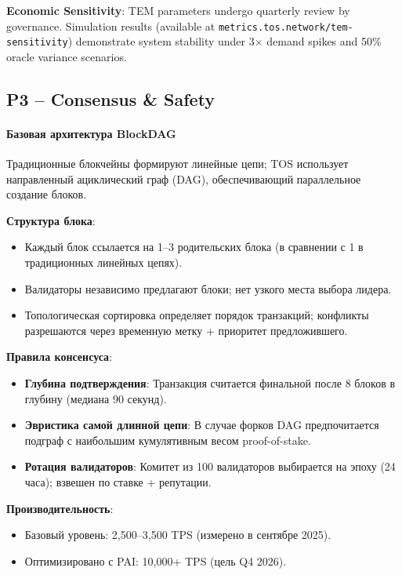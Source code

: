 \documentclass[11pt]{article}
\begin{document}
\textbf{Economic Sensitivity}: TEM parameters undergo quarterly review by governance. Simulation results (available at \texttt{metrics.tos.network/tem-sensitivity}) demonstrate system stability under 3$\times$ demand spikes and 50\% oracle variance scenarios.

\subsection{P3 -- Consensus \& Safety}
\label{sec:pillar-consensus}

\paragraph{Базовая архитектура BlockDAG}
Традиционные блокчейны формируют линейные цепи; TOS использует направленный ациклический граф (DAG), обеспечивающий параллельное создание блоков.

\textbf{Структура блока}:
\begin{itemize}[noitemsep]
  \item Каждый блок ссылается на 1--3 родительских блока (в сравнении с 1 в традиционных линейных цепях).
  \item Валидаторы независимо предлагают блоки; нет узкого места выбора лидера.
  \item Топологическая сортировка определяет порядок транзакций; конфликты разрешаются через временную метку + приоритет предложившего.
\end{itemize}

\textbf{Правила консенсуса}:
\begin{itemize}[noitemsep]
  \item \textbf{Глубина подтверждения}: Транзакция считается финальной после 8 блоков в глубину (медиана 90 секунд).
  \item \textbf{Эвристика самой длинной цепи}: В случае форков DAG предпочитается подграф с наибольшим кумулятивным весом proof-of-stake.
  \item \textbf{Ротация валидаторов}: Комитет из 100 валидаторов выбирается на эпоху (24 часа); взвешен по ставке + репутации.
\end{itemize}

\textbf{Производительность}:
\begin{itemize}[noitemsep]
  \item Базовый уровень: 2{,}500--3{,}500 TPS (измерено в сентябре 2025).
  \item Оптимизировано с PAI: 10{,}000+ TPS (цель Q4 2026).
\end{itemize}
\end{document}
